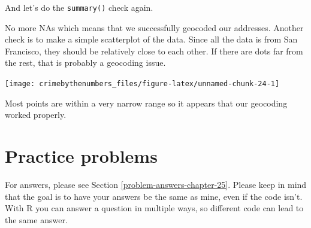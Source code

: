 \documentclass[
]{krantz}
\makeatletter
\newenvironment{Shaded}{\begin{snugshade}}{\end{snugshade}}
\newcommand{\CommentTok}[1]{\textcolor[rgb]{0.37,0.37,0.37}{\textit{#1}}}
\newcommand{\FunctionTok}[1]{\textcolor[rgb]{0,0,0}{#1}}
\newcommand{\NormalTok}[1]{#1}
\newcommand{\SpecialCharTok}[1]{\textcolor[rgb]{0,0,0}{#1}}
\newenvironment{kframe}{%
\medskip{}
\setlength{\fboxsep}{.8em}
 \def\at@end@of@kframe{}%
 \ifinner\ifhmode%
  \def\at@end@of@kframe{\end{minipage}}%
  \begin{minipage}{\columnwidth}%
 \fi\fi%
 \def\FrameCommand##1{\hskip\@totalleftmargin \hskip-\fboxsep
 \colorbox{shadecolor}{##1}\hskip-\fboxsep
     \hskip-\linewidth \hskip-\@totalleftmargin \hskip\columnwidth}%
 \MakeFramed {\advance\hsize-\width
   \@totalleftmargin\z@ \linewidth\hsize
   \@setminipage}}%
 {\par\unskip\endMakeFramed%
 \at@end@of@kframe}
\renewenvironment{Shaded}{\begin{kframe}}{\end{kframe}}
\makeatother
\begin{document}
And let's do the \texttt{summary()} check again.

\begin{Shaded}
\end{Shaded}

\begin{Shaded}
\end{Shaded}

No more NAs which means that we successfully geocoded our addresses. Another check is to make a simple scatterplot of the data. Since all the data is from San Francisco, they should be relatively close to each other. If there are dots far from the rest, that is probably a geocoding issue.

\begin{Shaded}
\end{Shaded}

\begin{center}\texttt{[image: crimebythenumbers\_files/figure-latex/unnamed-chunk-24-1]} \end{center}

Most points are within a very narrow range so it appears that our geocoding worked properly.

\hypertarget{practice-problems-18}{%
\section{Practice problems}\label{practice-problems-18}}

For answers, please see Section \ref{problem-answers-chapter-25}. Please keep in mind that the goal is to have your answers be the same as mine, even if the code isn't. With R you can answer a question in multiple ways, so different code can lead to the same answer.
\end{document}
